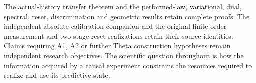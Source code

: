 The actual-history transfer theorem and the performed-law, variational,
dual, spectral, reset, discrimination and geometric results retain complete
proofs. The independent absolute-calibration companion and the original
finite-order measurement and two-stage reset realizations retain their
source identities. Claims requiring A1, A2 or further Theta construction
hypotheses remain independent research objectives. The scientific question
throughout is how the information acquired by a causal experiment constrains
the resources required to realize and use its predictive state.


